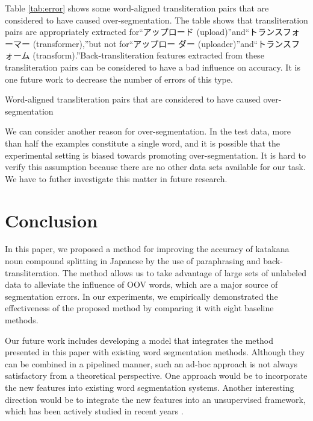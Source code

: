 \documentclass[english]{jnlp_1.4_rep}
\begin{document}
Table \ref{tab:error} shows some word-aligned transliteration pairs that
are considered to have caused over-segmentation. The table shows that
transliteration pairs are appropriately extracted for“アップロード
(upload)”and“トランスフォーマー (transformer),”but not for“アップロー
ダー (uploader)”and“トランスフォーム (transform).”Back-transliteration features extracted from these transliteration pairs
can be considered to have a bad influence on accuracy. It is one future
work to decrease the number of errors of this type.

\begin{table}[t]
 \caption{Word-aligned transliteration pairs that are considered to
 have caused over-segmentation}
 \label{tab:error}

\end{table}

We can consider another reason for over-segmentation. In the test data,
more than half the examples constitute a single word, and it is
possible that the experimental setting is biased towards promoting
over-segmentation. It is hard to verify this assumption because there
are no other data sets available for our task. We have to futher
investigate this matter in future research.


\section{Conclusion}
\label{sec:conclude}

In this paper, we proposed a method for improving the accuracy of
katakana noun compound splitting in Japanese by the use of paraphrasing
and back-transliteration. The method allows us to take advantage of
large sets of unlabeled data to alleviate the influence of OOV words,
which are a major source of segmentation errors. In our experiments,
we empirically demonstrated the effectiveness of the proposed method by
comparing it with eight baseline methods.

Our future work includes developing a model that integrates the method
presented in this paper with existing word segmentation
methods. Although they can be combined in a pipelined manner, such an
ad-hoc approach is not always satisfactory from a theoretical
perspective. One approach would be to incorporate the new features into
existing word segmentation systems. Another interesting direction would
be to integrate the new features into an unsupervised framework, which
has been actively studied in recent years \cite{Mochihashi09}.
\end{document}
